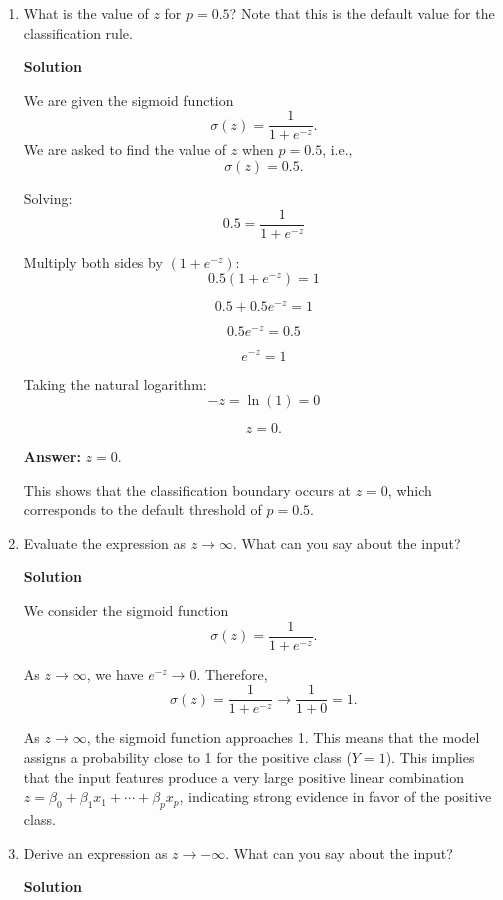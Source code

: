 \documentclass[10pt]{article}
\begin{document}
\begin{enumerate}[label=\roman*.]
    \item What is the value of $z$ for $p = 0.5$? Note that this is the default value for the classification rule.
    
    \textbf{Solution}
    
    We are given the sigmoid function
    \[
    \sigma(z) = \frac{1}{1 + e^{-z}}.
    \]
    We are asked to find the value of $z$ when $p = 0.5$, i.e.,
    \[
    \sigma(z) = 0.5.
    \]
    
    Solving:
    \[
    0.5 = \frac{1}{1 + e^{-z}}
    \]
    
    Multiply both sides by $(1 + e^{-z})$:
    \[
    0.5(1 + e^{-z}) = 1
    \]
    
    \[
    0.5 + 0.5 e^{-z} = 1
    \]
    
    \[
    0.5 e^{-z} = 0.5
    \]
    
    \[
    e^{-z} = 1
    \]
    
    Taking the natural logarithm:
    \[
    -z = \ln(1) = 0
    \]
    
    \[
    z = 0.
    \]
    
    \textbf{Answer:} $z = 0$.
    
    This shows that the classification boundary occurs at $z = 0$, which corresponds to the default threshold of $p = 0.5$.
    
    \item Evaluate the expression as $z \to \infty$. What can you say about the input?
    
    \textbf{Solution}
    
    We consider the sigmoid function
    \[
    \sigma(z) = \frac{1}{1 + e^{-z}}.
    \]
    
    As $z \to \infty$, we have $e^{-z} \to 0$. Therefore,
    \[
    \sigma(z) = \frac{1}{1 + e^{-z}} \to \frac{1}{1 + 0} = 1.
    \]
    
    As $z \to \infty$, the sigmoid function approaches 1. This means that the model assigns a probability close to 1 for the positive class ($Y = 1$). This implies that the input features produce a very large positive linear combination $z = \beta_0 + \beta_1 x_1 + \cdots + \beta_p x_p$, indicating strong evidence in favor of the positive class.
    
    \item Derive an expression as $z \to -\infty$. What can you say about the input?
    
    \textbf{Solution}
    

\end{enumerate}
\end{document}
